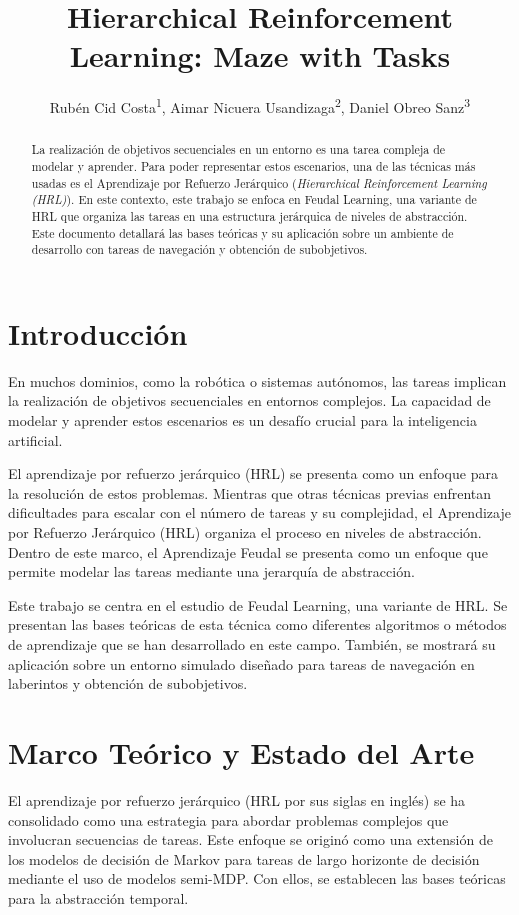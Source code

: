 \documentclass[letterpaper]{article} %
\title{Hierarchical Reinforcement Learning: Maze with Tasks}
\author {
    Rubén Cid Costa\textsuperscript{\rm 1},
    Aimar Nicuera Usandizaga\textsuperscript{\rm 2},
    Daniel Obreo Sanz\textsuperscript{\rm 3}
}
\begin{document}
\maketitle

\begin{abstract}
La realización de objetivos secuenciales en un entorno es una tarea compleja de modelar y aprender. Para poder representar estos
escenarios, una de las técnicas más usadas es el Aprendizaje por Refuerzo Jerárquico (\textit{Hierarchical Reinforcement Learning (HRL)}).
En este contexto, este trabajo se enfoca en Feudal Learning, una variante de HRL que organiza las tareas en una estructura jerárquica de
niveles de abstracción. Este documento detallará las bases teóricas y su aplicación sobre un ambiente de desarrollo con tareas de navegación y
obtención de subobjetivos.
\end{abstract}

\section{Introducción}

En muchos dominios, como la robótica o sistemas autónomos, las tareas implican la realización de objetivos secuenciales en entornos complejos.
La capacidad de modelar y aprender estos escenarios es un desafío crucial para la inteligencia artificial.

El aprendizaje por refuerzo jerárquico (HRL) se presenta como un enfoque para la resolución de estos problemas. Mientras que otras técnicas previas
enfrentan dificultades para escalar con el número de tareas y su complejidad, el Aprendizaje por Refuerzo Jerárquico (HRL) organiza el proceso en 
niveles de abstracción. Dentro de este marco, el Aprendizaje Feudal se presenta como un enfoque que permite modelar las tareas mediante una jerarquía
de abstracción.

Este trabajo se centra en el estudio de Feudal Learning, una variante de HRL. Se presentan las bases teóricas de esta técnica como diferentes algoritmos
o métodos de aprendizaje que se han desarrollado en este campo. También, se mostrará su aplicación sobre un entorno simulado diseñado para tareas 
de navegación en laberintos y obtención de subobjetivos. 

\section{Marco Teórico y Estado del Arte}
El aprendizaje por refuerzo jerárquico (HRL por sus siglas en inglés) se ha consolidado como una estrategia para abordar problemas complejos
que involucran secuencias de tareas. Este enfoque se originó como una extensión de los modelos de decisión de Markov para tareas de largo horizonte
de decisión mediante el uso de modelos semi-MDP\cite{sutton1999between}. Con ellos, se establecen las bases teóricas para la abstracción temporal.
\end{document}
